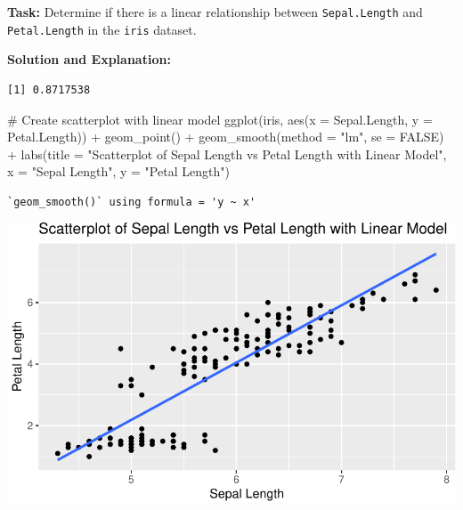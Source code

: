 \documentclass[
  letterpaper,
  DIV=11,
  numbers=noendperiod]{scrreprt}
\newenvironment{Shaded}{\begin{snugshade}}{\end{snugshade}}
\newcommand{\AttributeTok}[1]{\textcolor[rgb]{0.40,0.45,0.13}{#1}}
\newcommand{\CommentTok}[1]{\textcolor[rgb]{0.37,0.37,0.37}{#1}}
\newcommand{\ConstantTok}[1]{\textcolor[rgb]{0.56,0.35,0.01}{#1}}
\newcommand{\FunctionTok}[1]{\textcolor[rgb]{0.28,0.35,0.67}{#1}}
\newcommand{\NormalTok}[1]{\textcolor[rgb]{0.00,0.23,0.31}{#1}}
\newcommand{\OtherTok}[1]{\textcolor[rgb]{0.00,0.23,0.31}{#1}}
\newcommand{\SpecialCharTok}[1]{\textcolor[rgb]{0.37,0.37,0.37}{#1}}
\newcommand{\StringTok}[1]{\textcolor[rgb]{0.13,0.47,0.30}{#1}}
\begin{document}
\textbf{Task:} Determine if there is a linear relationship between
\texttt{Sepal.Length} and \texttt{Petal.Length} in the \texttt{iris}
dataset.

\textbf{Solution and Explanation:}

\begin{Shaded}
\end{Shaded}

\begin{verbatim}
[1] 0.8717538
\end{verbatim}

\begin{Shaded}
\begin{Highlighting}[]
\CommentTok{\# Create scatterplot with linear model}
\FunctionTok{ggplot}\NormalTok{(iris, }\FunctionTok{aes}\NormalTok{(}\AttributeTok{x =}\NormalTok{ Sepal.Length, }\AttributeTok{y =}\NormalTok{ Petal.Length)) }\SpecialCharTok{+}
  \FunctionTok{geom\_point}\NormalTok{() }\SpecialCharTok{+}
  \FunctionTok{geom\_smooth}\NormalTok{(}\AttributeTok{method =} \StringTok{"lm"}\NormalTok{, }\AttributeTok{se =} \ConstantTok{FALSE}\NormalTok{) }\SpecialCharTok{+}
  \FunctionTok{labs}\NormalTok{(}\AttributeTok{title =} \StringTok{"Scatterplot of Sepal Length vs Petal Length with Linear Model"}\NormalTok{, }\AttributeTok{x =} \StringTok{"Sepal Length"}\NormalTok{, }\AttributeTok{y =} \StringTok{"Petal Length"}\NormalTok{)}
\end{Highlighting}
\end{Shaded}

\begin{verbatim}
`geom_smooth()` using formula = 'y ~ x'
\end{verbatim}

\includegraphics{Linear_Modeling_and_Regression_files/figure-pdf/unnamed-chunk-16-1.pdf}
\end{document}
